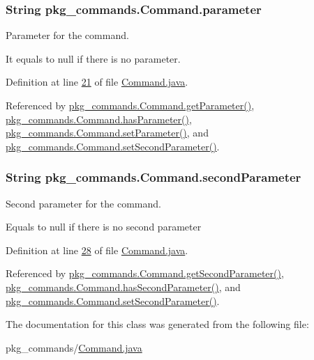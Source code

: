 \hypertarget{classpkg__commands_1_1Command_a089fe1b30b43b2ad5f0dcb2f0ffc2fdd}{
\subsubsection[{parameter}]{\setlength{\rightskip}{0pt plus 5cm}String pkg\-\_\-commands.\-Command.\-parameter\hspace{0.3cm}{\ttfamily [private]}}}\label{classpkg__commands_1_1Command_a089fe1b30b43b2ad5f0dcb2f0ffc2fdd}


Parameter for the command. 

It equals to null if there is no parameter. 

Definition at line \hyperlink{Command_8java_source_l00021}{21} of file \hyperlink{Command_8java_source}{Command.\-java}.



Referenced by \hyperlink{Command_8java_source_l00041}{pkg\-\_\-commands.\-Command.\-get\-Parameter()}, \hyperlink{Command_8java_source_l00073}{pkg\-\_\-commands.\-Command.\-has\-Parameter()}, \hyperlink{Command_8java_source_l00057}{pkg\-\_\-commands.\-Command.\-set\-Parameter()}, and \hyperlink{Command_8java_source_l00065}{pkg\-\_\-commands.\-Command.\-set\-Second\-Parameter()}.

\hypertarget{classpkg__commands_1_1Command_a5f0b6df5ba798c9ee4446f01a0352210}{
\subsubsection[{second\-Parameter}]{\setlength{\rightskip}{0pt plus 5cm}String pkg\-\_\-commands.\-Command.\-second\-Parameter\hspace{0.3cm}{\ttfamily [private]}}}\label{classpkg__commands_1_1Command_a5f0b6df5ba798c9ee4446f01a0352210}


Second parameter for the command. 

Equals to null if there is no second parameter 

Definition at line \hyperlink{Command_8java_source_l00028}{28} of file \hyperlink{Command_8java_source}{Command.\-java}.



Referenced by \hyperlink{Command_8java_source_l00049}{pkg\-\_\-commands.\-Command.\-get\-Second\-Parameter()}, \hyperlink{Command_8java_source_l00081}{pkg\-\_\-commands.\-Command.\-has\-Second\-Parameter()}, and \hyperlink{Command_8java_source_l00065}{pkg\-\_\-commands.\-Command.\-set\-Second\-Parameter()}.



The documentation for this class was generated from the following file\-:\begin{DoxyCompactItemize}
\item 
pkg\-\_\-commands/\hyperlink{Command_8java}{Command.\-java}\end{DoxyCompactItemize}
